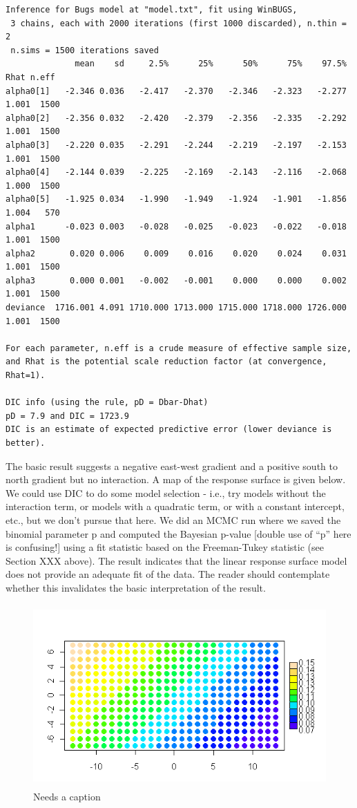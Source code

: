 \begin{verbatim}
Inference for Bugs model at "model.txt", fit using WinBUGS,
 3 chains, each with 2000 iterations (first 1000 discarded), n.thin = 2
 n.sims = 1500 iterations saved
              mean    sd     2.5%      25%      50%      75%    97.5%  Rhat n.eff
alpha0[1]   -2.346 0.036   -2.417   -2.370   -2.346   -2.323   -2.277 1.001  1500
alpha0[2]   -2.356 0.032   -2.420   -2.379   -2.356   -2.335   -2.292 1.001  1500
alpha0[3]   -2.220 0.035   -2.291   -2.244   -2.219   -2.197   -2.153 1.001  1500
alpha0[4]   -2.144 0.039   -2.225   -2.169   -2.143   -2.116   -2.068 1.000  1500
alpha0[5]   -1.925 0.034   -1.990   -1.949   -1.924   -1.901   -1.856 1.004   570
alpha1      -0.023 0.003   -0.028   -0.025   -0.023   -0.022   -0.018 1.001  1500
alpha2       0.020 0.006    0.009    0.016    0.020    0.024    0.031 1.001  1500
alpha3       0.000 0.001   -0.002   -0.001    0.000    0.000    0.002 1.001  1500
deviance  1716.001 4.091 1710.000 1713.000 1715.000 1718.000 1726.000 1.001  1500

For each parameter, n.eff is a crude measure of effective sample size,
and Rhat is the potential scale reduction factor (at convergence, Rhat=1).

DIC info (using the rule, pD = Dbar-Dhat)
pD = 7.9 and DIC = 1723.9
DIC is an estimate of expected predictive error (lower deviance is better).
\end{verbatim}

The basic result suggests a negative east-west gradient and a positive south to north gradient but no interaction. A map of the response surface is given below. We could use DIC to do some model selection - i.e., try models without the interaction term, or models with a quadratic term, or with a constant intercept, etc., but we don't pursue that here. We did an MCMC run where we saved the binomial parameter p and computed the Bayesian p-value [double use of ``p'' here is confusing!] using a fit statistic based on the Freeman-Tukey statistic (see Section XXX above). The result indicates that the linear response surface model does not provide an adequate fit of the data. The reader should contemplate whether this invalidates the basic interpretation of the result.


\begin{figure}
\begin{center}
\includegraphics[height=2.75in]{figs/responsesurface}
\end{center}
\caption{Needs a caption}
\label{fig.responsesurface}
\end{figure}

